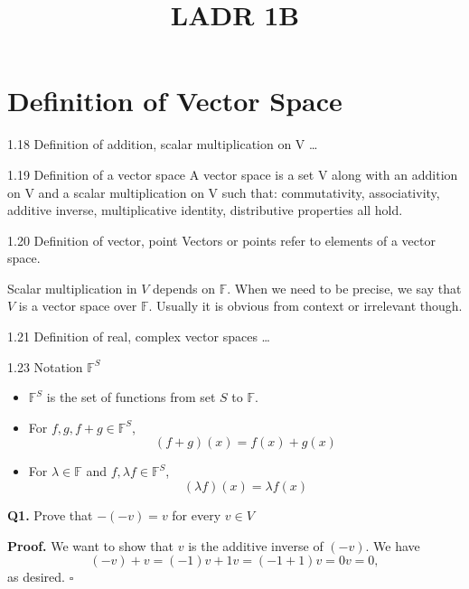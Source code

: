 \documentclass[12pt, letterpaper]{article}
\title{LADR 1B}
\begin{document}
\maketitle

\section*{Definition of Vector Space}
\begin{imp}{1.18 Definition of addition, scalar multiplication on V}
\ldots
\end{imp}

\begin{imp}{1.19 Definition of a vector space}
A vector space is a set V along with an addition on V and a scalar multiplication on V such that:
commutativity, associativity, additive inverse, multiplicative identity, distributive properties
all hold.
\end{imp}
    
\begin{imp}{1.20 Definition of vector, point}
Vectors or points refer to elements of a vector space.
\end{imp}
    
Scalar multiplication in $V$ depends on $\mathbb{F}$. When we need to be precise, we
say that $V$ is a vector space over $\mathbb{F}$. Usually it is obvious from context
or irrelevant though.
    
\begin{imp}{1.21 Definition of real, complex vector spaces}
\ldots
\end{imp}
    
\begin{imp}{1.23 Notation $\mathbb{F}^S$}
\begin{itemize}
    \item $\mathbb{F}^S$ is the set of functions from set $S$ to $\mathbb{F}$.
    \item For $f,g,f+g\in\mathbb{F}^S$,
    $$(f+g)(x) = f(x) + g(x)$$
    \item For $\lambda\in\mathbb{F}$ and $f,\lambda f\in\mathbb{F}^S$,
    $$(\lambda f)(x)=\lambda f(x)$$
\end{itemize}
\end{imp}

\textbf{Q1.}							%
Prove that $-(-v)=v$ for every $v\in V$																				%

\textbf{Proof.}              						%
We want to show that $v$ is the additive inverse of $(-v)$. We have 
$$(-v)+v=(-1)v+1v=(-1+1)v=0v=0,$$
as desired. $\square$
\end{document}
